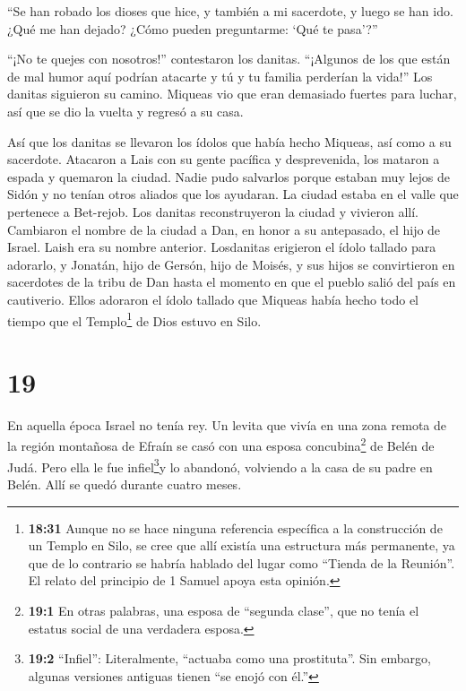  ``Se han robado los dioses que hice, y también a mi
sacerdote, y luego se han ido. ¿Qué me han dejado? ¿Cómo pueden
preguntarme: `Qué te pasa'?''

 ``¡No te quejes con nosotros!'' contestaron los danitas.
``¡Algunos de los que están de mal humor aquí podrían atacarte y tú y tu
familia perderían la vida!''  Los danitas siguieron su
camino. Miqueas vio que eran demasiado fuertes para luchar, así que se
dio la vuelta y regresó a su casa.

 Así que los danitas se llevaron los ídolos que había hecho
Miqueas, así como a su sacerdote. Atacaron a Lais con su gente pacífica
y desprevenida, los mataron a espada y quemaron la ciudad. 
Nadie pudo salvarlos porque estaban muy lejos de Sidón y no tenían otros
aliados que los ayudaran. La ciudad estaba en el valle que pertenece a
Bet-rejob. Los danitas reconstruyeron la ciudad y vivieron allí.
 Cambiaron el nombre de la ciudad a Dan, en honor a su
antepasado, el hijo de Israel. Laish era su nombre anterior.
 Losdanitas erigieron el ídolo tallado para adorarlo, y
Jonatán, hijo de Gersón, hijo de Moisés, y sus hijos se convirtieron en
sacerdotes de la tribu de Dan hasta el momento en que el pueblo salió
del país en cautiverio.  Ellos adoraron el ídolo tallado
que Miqueas había hecho todo el tiempo que el Templo\footnote{\textbf{18:31}
  Aunque no se hace ninguna referencia específica a la construcción de
  un Templo en Silo, se cree que allí existía una estructura más
  permanente, ya que de lo contrario se habría hablado del lugar como
  ``Tienda de la Reunión''. El relato del principio de 1 Samuel apoya
  esta opinión.} de Dios estuvo en Silo.

\hypertarget{section-18}{%
\section{19}\label{section-18}}

 En aquella época Israel no tenía rey. Un levita que vivía
en una zona remota de la región montañosa de Efraín se casó con una
esposa concubina\footnote{\textbf{19:1} En otras palabras, una esposa de
  ``segunda clase'', que no tenía el estatus social de una verdadera
  esposa.} de Belén de Judá.  Pero ella le fue
infiel\footnote{\textbf{19:2} ``Infiel'': Literalmente, ``actuaba como
  una prostituta''. Sin embargo, algunas versiones antiguas tienen ``se
  enojó con él.''}y lo abandonó, volviendo a la casa de su padre en
Belén. Allí se quedó durante cuatro meses.

